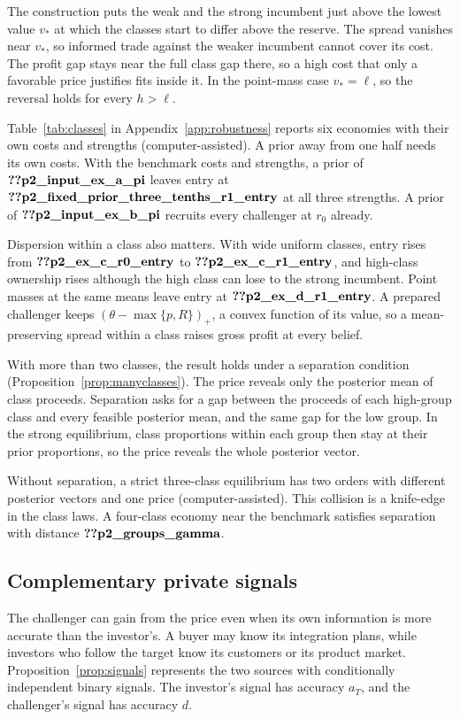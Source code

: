 The construction puts the weak and the strong incumbent
just above the lowest value \(v_*\) at which the classes start to differ above the reserve. The spread vanishes near
\(v_*\), so informed trade against the weaker incumbent cannot cover its cost. The profit gap stays near the full class
gap there, so a high cost that only a favorable price justifies fits inside it. In the point-mass case
\(v_*=\ell\), so the reversal holds for every \(h>\ell\).

Table~\ref{tab:classes} in Appendix~\ref{app:robustness} reports six economies with their own costs and strengths
(computer-assisted). A prior away from one half needs its own costs. With the benchmark costs and strengths, a prior
of \(\reg{p2_input_ex_a_pi}\) leaves entry at \(\reg{p2_fixed_prior_three_tenths_r1_entry}\) at all three strengths. A
prior of \(\reg{p2_input_ex_b_pi}\) recruits every challenger at \(r_0\) already.

Dispersion within a class also matters. With wide uniform classes, entry rises from \(\reg{p2_ex_c_r0_entry}\) to \(\reg{p2_ex_c_r1_entry}\), and
high-class ownership rises although the high class can lose to the strong incumbent. Point masses at the same means
leave entry at \(\reg{p2_ex_d_r1_entry}\). A prepared challenger keeps \((\theta-\max\{p,R\})_+\), a convex function of
its value, so a mean-preserving spread within a class raises gross profit at every belief.

With more than two classes, the result holds under a separation condition (Proposition~\ref{prop:manyclasses}). The
price reveals only the posterior mean of class proceeds. Separation asks for a gap between the proceeds of each
high-group class and every feasible posterior mean, and the same gap for the low group. In the strong equilibrium,
class proportions within each group then stay at their prior proportions, so the price reveals the whole posterior
vector.

Without separation, a strict three-class equilibrium has two orders with different posterior vectors and one
price (computer-assisted). This collision is a knife-edge in the class laws. A four-class economy near the benchmark
satisfies separation with distance \(\reg{p2_groups_gamma}\).

\subsection{Complementary private signals}\label{sec:signals}

The challenger can gain from the price even when its own information is more accurate than the investor's. A buyer
may know its integration plans, while investors who follow the target know its customers or its product market.
Proposition~\ref{prop:signals} represents the two sources with conditionally independent binary signals. The
investor's signal has accuracy \(a_T\), and the challenger's signal has accuracy \(d\).

